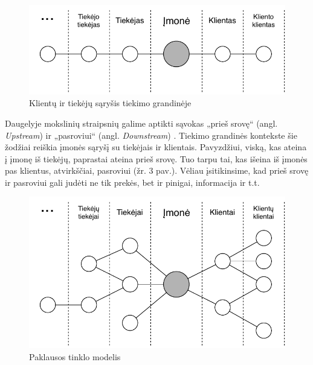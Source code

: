 \begin{figure}[H]
    \centering
    \includegraphics[scale=1]{images/client-supplier-model}
    \caption{Klientų ir tiekėjų sąryšis tiekimo grandinėje}
\end{figure}

Daugelyje mokslinių straipsnių galime aptikti sąvokas „prieš srovę“ (angl. \textit{Upstream}) ir „pasroviui“ (angl. \textit{Downstream}) \cite{croson2005upstream} \cite{frohlich2001arcs} \cite{vachon2006extending}. Tiekimo grandinės kontekste šie žodžiai reiškia įmonės sąryšį su tiekėjais ir klientais. Pavyzdžiui, viską, kas ateina į įmonę iš tiekėjų, paprastai ateina prieš srovę. Tuo tarpu tai, kas išeina iš įmonės pas klientus, atvirkščiai, pasroviui \cite{christopher2016logistics} (žr. 3 pav.). Vėliau įsitikinsime, kad prieš srovę ir pasroviui gali judėti ne tik prekės, bet ir pinigai, informacija ir t.t.

\begin{figure}[H]
    \centering
    \includegraphics[scale=1]{images/demand-network-model}
    \caption{Paklausos tinklo modelis}
\end{figure}

